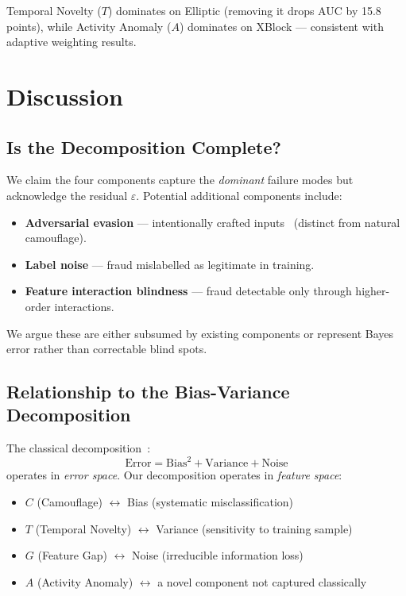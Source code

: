 \documentclass[journal]{IEEEtran}
\begin{document}
Temporal Novelty ($T$) dominates on Elliptic (removing it drops AUC by 15.8 points), while Activity Anomaly ($A$) dominates on XBlock --- consistent with adaptive weighting results.

\section{Discussion}
\label{sec:discussion}

\subsection{Is the Decomposition Complete?}

We claim the four components capture the \textit{dominant} failure modes but acknowledge the residual $\varepsilon$. Potential additional components include:

\begin{itemize}
  \item \textbf{Adversarial evasion} --- intentionally crafted inputs~\cite{goodfellow2015} (distinct from natural camouflage).
  \item \textbf{Label noise} --- fraud mislabelled as legitimate in training.
  \item \textbf{Feature interaction blindness} --- fraud detectable only through higher-order interactions.
\end{itemize}

We argue these are either subsumed by existing components or represent Bayes error rather than correctable blind spots.

\subsection{Relationship to the Bias-Variance Decomposition}

The classical decomposition~\cite{geman1992}:
\begin{equation}
  \text{Error} = \text{Bias}^2 + \text{Variance} + \text{Noise}
  \label{eq:bv}
\end{equation}
operates in \textit{error space}. Our decomposition operates in \textit{feature space}:
\begin{itemize}
  \item $C$ (Camouflage) $\leftrightarrow$ Bias (systematic misclassification)
  \item $T$ (Temporal Novelty) $\leftrightarrow$ Variance (sensitivity to training sample)
  \item $G$ (Feature Gap) $\leftrightarrow$ Noise (irreducible information loss)
  \item $A$ (Activity Anomaly) $\leftrightarrow$ a novel component not captured classically
\end{itemize}
\end{document}
